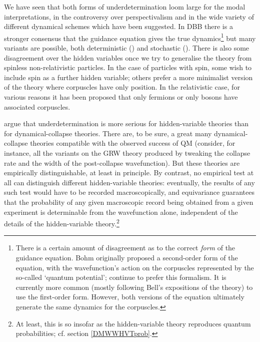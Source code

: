 \documentclass[12pt]{article}
\begin{document}
We have seen that both forms of underdetermination loom large for the modal interpretations, in the controversy over perspectivalism and in the  wide variety of different dynamical schemes which have been suggested. In DBB there is a stronger consensus that the guidance equation gives the true dynamics\footnote{There is a certain amount of disagreement as to the correct \emph{form} of the guidance equation. Bohm originally proposed a second-order form of the equation, with the wavefunction's action on the corpuscles represented by the so-called `quantum potential';  continue to prefer this formalism. It is currently more common  (mostly following Bell's expositions of the theory) to use the first-order form. However, both versions of the equation ultimately generate the same dynamics for the corpuscles.} but many variants are possible, both deterministic () and stochastic  (). There is also 
some disagreement over the hidden variables once we try to generalise the theory from spinless non-relativistic particles. In the case of particles with spin, some  wish to include spin as a further hidden variable; others  prefer a more minimalist version of the theory where corpuscles have only position. In the relativistic case, for various reasons it has been proposed that only fermions \cite{bellbeablesqft} or only bosons \cite{westman} have associated corpuscles.


 argue that underdetermination is more serious for hidden-variable theories than for dynamical-collapse theories. There are, to be sure, a great many dynamical-collapse theories compatible with the observed success of QM (consider, for instance, all the variants on the GRW theory produced by tweaking the collapse rate and the width of the post-collapse wavefunction). But these theories are empirically distinguishable, at least in principle. By contrast, no empirical test at all can distinguish different hidden-variable theories: eventually, the results of any such test would have to be recorded macroscopically, and equivariance guarantees that the probability of any given macroscopic record being obtained from a given experiment is determinable from the wavefunction alone, independent of the details of the hidden-variable theory.\footnote{At least, this is so insofar as the hidden-variable theory reproduces quantum probabilities; cf. section \ref{DMWWHVTprob}.}
\end{document}
